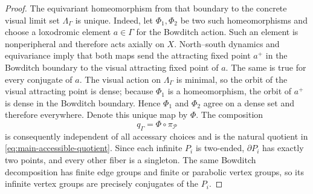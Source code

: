 \documentclass[11pt]{article}
\theoremstyle{definition}
\begin{document}
\begin{proof}
The equivariant homeomorphism from that boundary to the concrete visual limit set
$\Lambda_\Gamma$ is unique.  Indeed, let $\Phi_1,\Phi_2$ be two such homeomorphisms and choose
a loxodromic element $a\in\Gamma$ for the Bowditch action.  Such an element is
nonperipheral and therefore acts axially on $X$.  North--south dynamics and equivariance imply
that both
maps send the attracting fixed point $a^+$ in the Bowditch boundary to the visual attracting
fixed point of $a$.  The same is true for every conjugate of $a$.  The visual action on
$\Lambda_\Gamma$ is minimal, so the orbit of the visual attracting point is dense; because
$\Phi_1$ is a homeomorphism, the orbit of $a^+$ is dense in the Bowditch boundary.  Hence
$\Phi_1$ and $\Phi_2$ agree on a dense set and therefore everywhere.  Denote this unique map
by $\Phi$.  The composition
\[
 q_\Gamma=\Phi\circ\pi_{\mathcal P}
\]
is consequently independent of all accessary choices and is the natural quotient in
\eqref{eq:main-accessible-quotient}.  Since each infinite $P_i$ is two-ended,
$\partial P_i$ has exactly two points, and every other fiber is a singleton.  The same Bowditch
decomposition has finite edge groups and finite or parabolic vertex groups, so its infinite
vertex groups are precisely conjugates of the $P_i$.
\end{proof}
\end{document}
